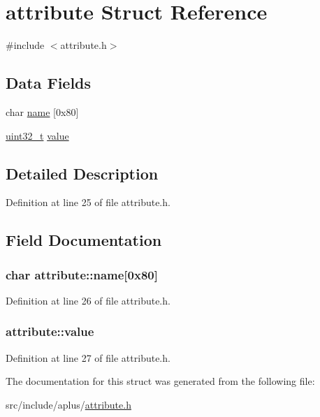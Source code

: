 \hypertarget{structattribute}{\section{attribute Struct Reference}
\label{structattribute}
}


{\ttfamily \#include $<$attribute.\+h$>$}

\subsection*{Data Fields}
\begin{DoxyCompactItemize}
\item 
char \hyperlink{structattribute_ab0c3a4d25c5c24cd1ea3af2a6631267d}{name} \mbox{[}0x80\mbox{]}
\item 
\hyperlink{aplus_8h_a53a0df51603c77c2aa5b9ea61b606a82}{uint32\+\_\+t} \hyperlink{structattribute_a868a57c7ba49cfa75755e4061662abe3}{value}
\end{DoxyCompactItemize}


\subsection{Detailed Description}


Definition at line 25 of file attribute.\+h.



\subsection{Field Documentation}
\hypertarget{structattribute_ab0c3a4d25c5c24cd1ea3af2a6631267d}{
\subsubsection[{name}]{\setlength{\rightskip}{0pt plus 5cm}char attribute\+::name\mbox{[}0x80\mbox{]}}}\label{structattribute_ab0c3a4d25c5c24cd1ea3af2a6631267d}


Definition at line 26 of file attribute.\+h.

\hypertarget{structattribute_a868a57c7ba49cfa75755e4061662abe3}{
\subsubsection[{value}]{ attribute\+::value}}\label{structattribute_a868a57c7ba49cfa75755e4061662abe3}


Definition at line 27 of file attribute.\+h.



The documentation for this struct was generated from the following file\+:\begin{DoxyCompactItemize}
\item 
src/include/aplus/\hyperlink{attribute_8h}{attribute.\+h}\end{DoxyCompactItemize}
